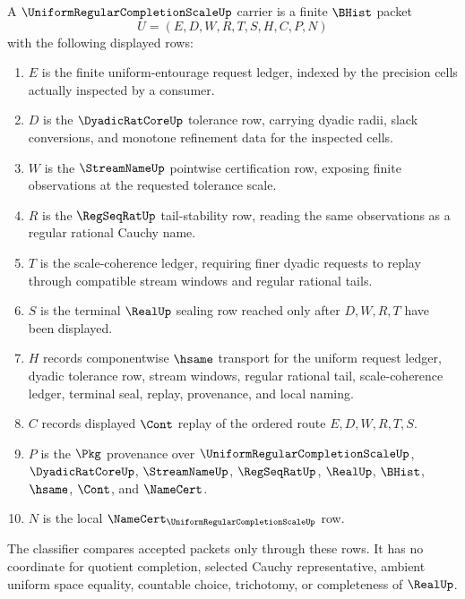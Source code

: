 \begin{definition}
\label{def:uniform-regular-completion-scale-carrier}
A $\UniformRegularCompletionScaleUp$ carrier is a finite $\BHist$ packet
$$
U=(E,D,W,R,T,S,H,C,P,N)
$$
with the following displayed rows:
\begin{enumerate}
\item $E$ is the finite uniform-entourage request ledger, indexed by the precision cells actually inspected by a consumer.
\item $D$ is the $\DyadicRatCoreUp$ tolerance row, carrying dyadic radii, slack conversions, and monotone refinement data for the inspected cells.
\item $W$ is the $\StreamNameUp$ pointwise certification row, exposing finite observations at the requested tolerance scale.
\item $R$ is the $\RegSeqRatUp$ tail-stability row, reading the same observations as a regular rational Cauchy name.
\item $T$ is the scale-coherence ledger, requiring finer dyadic requests to replay through compatible stream windows and regular rational tails.
\item $S$ is the terminal $\RealUp$ sealing row reached only after $D,W,R,T$ have been displayed.
\item $H$ records componentwise $\hsame$ transport for the uniform request ledger, dyadic tolerance row, stream windows, regular rational tail, scale-coherence ledger, terminal seal, replay, provenance, and local naming.
\item $C$ records displayed $\Cont$ replay of the ordered route $E,D,W,R,T,S$.
\item $P$ is the $\Pkg$ provenance over $\UniformRegularCompletionScaleUp$, $\DyadicRatCoreUp$, $\StreamNameUp$, $\RegSeqRatUp$, $\RealUp$, $\BHist$, $\hsame$, $\Cont$, and $\NameCert$.
\item $N$ is the local $\NameCert_{\UniformRegularCompletionScaleUp}$ row.
\end{enumerate}
The classifier compares accepted packets only through these rows. It has no coordinate for quotient completion, selected Cauchy representative, ambient uniform space equality, countable choice, trichotomy, or completeness of $\RealUp$.
\end{definition}

